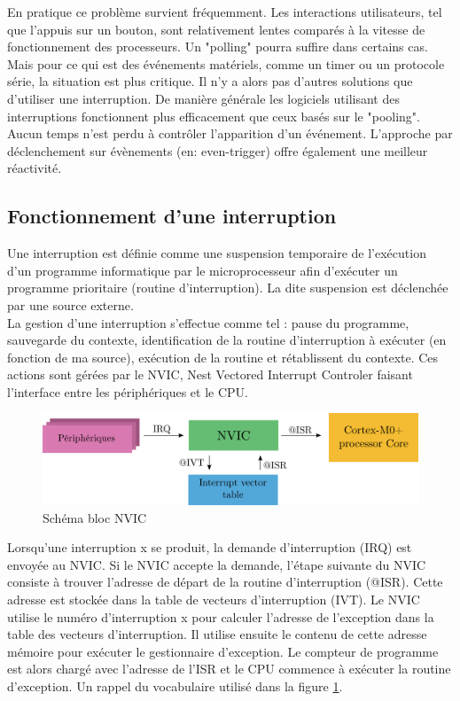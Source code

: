 \documentclass[a4paper]{article}
\begin{document}
	En pratique ce problème survient fréquemment. Les interactions utilisateurs, tel que l'appuis sur un bouton, sont relativement lentes comparés à la vitesse de fonctionnement des processeurs. Un "polling" pourra suffire dans certains cas. Mais pour ce qui est des événements matériels, comme un timer ou un protocole série, la situation est plus critique. Il n'y a alors pas d'autres solutions que d'utiliser une interruption. De manière générale les logiciels utilisant des interruptions fonctionnent plus efficacement que ceux basés sur le "pooling". Aucun temps n'est perdu à contrôler l'apparition d'un événement. L'approche par déclenchement sur évènements (en: even-trigger) offre également une meilleur réactivité. \cite{ARM_book}
	\subsection{Fonctionnement d'une interruption }
	Une interruption est définie comme une suspension temporaire de l'exécution d'un programme informatique par le microprocesseur afin d'exécuter un programme prioritaire (routine d'interruption). La dite suspension est déclenchée par une source externe. \\
	La gestion d'une interruption s'effectue comme tel : pause du programme, sauvegarde du contexte, identification de la routine d'interruption à exécuter (en fonction de ma source), exécution de la routine et rétablissent du contexte. Ces actions sont gérées par le NVIC, Nest Vectored Interrupt Controler faisant l'interface entre les périphériques et le CPU.
	\begin{figure}[H]
		\centering
		\includegraphics[width=0.9\linewidth]{NVIC}
		\caption{Schéma bloc NVIC}
		\label{fig:NVIC}
	\end{figure}
	
	
	Lorsqu'une interruption x se produit, la demande d'interruption (IRQ) est envoyée au NVIC. Si le NVIC accepte la demande, l'étape suivante du NVIC consiste à trouver l'adresse de départ de la routine d'interruption (@ISR). Cette adresse est stockée dans la table de vecteurs d'interruption (IVT). Le NVIC utilise le numéro d'interruption x pour calculer l'adresse de l'exception dans la table des vecteurs d'interruption. Il utilise ensuite le contenu de cette adresse mémoire pour exécuter le gestionnaire d'exception. Le compteur de programme est alors chargé avec l'adresse de l'ISR et le CPU commence à exécuter la routine d'exception.
	Un rappel du vocabulaire utilisé dans la figure \ref{fig:NVIC}.
	
\end{document}
